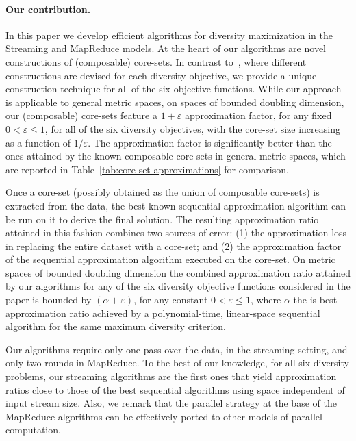 \documentclass{article}
\renewcommand{\epsilon}{\varepsilon}
\begin{document}
\paragraph{Our contribution.}
In this paper we develop efficient algorithms for diversity
maximization in the Streaming and MapReduce models.  At the heart of
our algorithms are novel constructions of (composable) core-sets.
In contrast to~\cite{IndykMMM14, AghamolaeiFZ15}, where
different constructions are devised for each diversity objective, we
provide a unique construction technique for all of the six objective
functions.  While our approach is applicable to general metric spaces,
on spaces of bounded doubling dimension, our (composable) core-sets
feature a $1+\epsilon$ approximation factor, for any fixed
$0<\epsilon\leq 1$, for all of the six diversity objectives, with the
core-set size increasing as a function of
$1/\epsilon$. The approximation factor is significantly better than
the ones attained by the known composable core-sets in general metric
spaces, which are reported in Table~\ref{tab:core-set-approximations}
for comparison.

Once a core-set (possibly obtained as the union of composable
core-sets) is extracted from the data, the best known sequential
approximation algorithm can be run on it to derive the final
solution. The resulting approximation ratio attained in this fashion
combines two sources of error: (1) the approximation loss in replacing
the entire dataset with a core-set; and (2) the approximation factor
of the sequential approximation algorithm executed on the core-set.
On metric spaces of bounded doubling dimension the combined
approximation ratio attained by our algorithms for any of the six
diversity objective functions considered in the paper is bounded by
$(\alpha+\epsilon)$, for any constant $0<\epsilon\leq 1$, where
$\alpha$ the is best approximation ratio achieved by a
polynomial-time, linear-space sequential algorithm for the same
maximum diversity criterion.

Our algorithms require only one pass over the data, in the streaming
setting, and only two rounds in MapReduce. To the best of our
knowledge, for all six diversity problems, our streaming algorithms
are the first ones that yield approximation ratios close to those of
the best sequential algorithms using space independent of input stream
size. Also, we remark that the parallel strategy at the base of the
MapReduce algorithms can be effectively ported to other models of
parallel computation.
\end{document}
